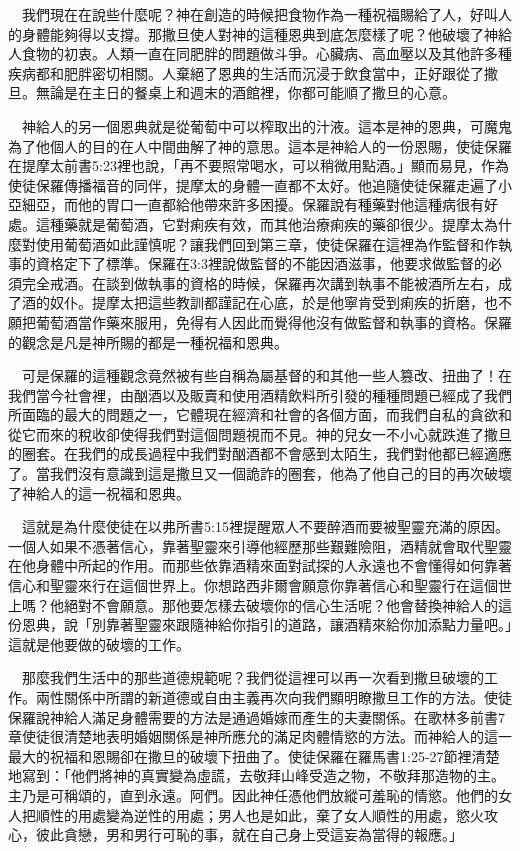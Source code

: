 \documentclass{book}
\begin{document}
　我們現在在說些什麼呢？神在創造的時候把食物作為一種祝福賜給了人，好叫人的身體能夠得以支撐。那撒旦使人對神的這種恩典到底怎麼樣了呢？他破壞了神給人食物的初衷。人類一直在同肥胖的問題做斗爭。心臟病、高血壓以及其他許多種疾病都和肥胖密切相關。人棄絕了恩典的生活而沉浸于飲食當中，正好跟從了撒旦。無論是在主日的餐桌上和週末的酒館裡，你都可能順了撒旦的心意。

　神給人的另一個恩典就是從葡萄中可以榨取出的汁液。這本是神的恩典，可魔鬼為了他個人的目的在人中間曲解了神的意思。這本是神給人的一份恩賜，使徒保羅在提摩太前書5:23裡也說，「再不要照常喝水，可以稍微用點酒。」顯而易見，作為使徒保羅傳播福音的同伴，提摩太的身體一直都不太好。他追隨使徒保羅走遍了小亞細亞，而他的胃口一直都給他帶來許多困擾。保羅說有種藥對他這種病很有好處。這種藥就是葡萄酒，它對痢疾有效，而其他治療痢疾的藥卻很少。提摩太為什麼對使用葡萄酒如此謹慎呢？讓我們回到第三章，使徒保羅在這裡為作監督和作執事的資格定下了標準。保羅在3:3裡說做監督的不能因酒滋事，他要求做監督的必須完全戒酒。在談到做執事的資格的時候，保羅再次講到執事不能被酒所左右，成了酒的奴仆。提摩太把這些教訓都謹記在心底，於是他寧肯受到痢疾的折磨，也不願把葡萄酒當作藥來服用，免得有人因此而覺得他沒有做監督和執事的資格。保羅的觀念是凡是神所賜的都是一種祝福和恩典。

　可是保羅的這種觀念竟然被有些自稱為屬基督的和其他一些人篡改、扭曲了！在我們當今社會裡，由酗酒以及販賣和使用酒精飲料所引發的種種問題已經成了我們所面臨的最大的問題之一，它體現在經濟和社會的各個方面，而我們自私的貪欲和從它而來的稅收卻使得我們對這個問題視而不見。神的兒女一不小心就跌進了撒旦的圈套。在我們的成長過程中我們對酗酒都不會感到太陌生，我們對他都已經適應了。當我們沒有意識到這是撒旦又一個詭詐的圈套，他為了他自己的目的再次破壞了神給人的這一祝福和恩典。

　這就是為什麼使徒在以弗所書5:15裡提醒眾人不要醉酒而要被聖靈充滿的原因。一個人如果不憑著信心，靠著聖靈來引導他經歷那些艱難險阻，酒精就會取代聖靈在他身體中所起的作用。而那些依靠酒精來面對試探的人永遠也不會懂得如何靠著信心和聖靈來行在這個世界上。你想路西非爾會願意你靠著信心和聖靈行在這個世上嗎？他絕對不會願意。那他要怎樣去破壞你的信心生活呢？他會替換神給人的這份恩典，說「別靠著聖靈來跟隨神給你指引的道路，讓酒精來給你加添點力量吧。」這就是他要做的破壞的工作。

　那麼我們生活中的那些道德規範呢？我們從這裡可以再一次看到撒旦破壞的工作。兩性關係中所謂的新道德或自由主義再次向我們顯明瞭撒旦工作的方法。使徒保羅說神給人滿足身體需要的方法是通過婚嫁而產生的夫妻關係。在歌林多前書7章使徒很清楚地表明婚姻關係是神所應允的滿足肉體情慾的方法。而神給人的這一最大的祝福和恩賜卻在撒旦的破壞下扭曲了。使徒保羅在羅馬書1:25-27節裡清楚地寫到：「他們將神的真實變為虛謊，去敬拜山峰受造之物，不敬拜那造物的主。主乃是可稱頌的，直到永遠。阿們。因此神任憑他們放縱可羞恥的情慾。他們的女人把順性的用處變為逆性的用處；男人也是如此，棄了女人順性的用處，慾火攻心，彼此貪戀，男和男行可恥的事，就在自己身上受這妄為當得的報應。」
\end{document}
